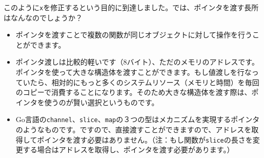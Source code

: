 このように\texttt{x}を修正するという目的に到達しました。では、ポインタを渡す長所はなんなのでしょうか？

\begin{itemize}
  \item ポインタを渡すことで複数の関数が同じオブジェクトに対して操作を行うことができます。
  \item ポインタ渡しは比較的軽いです（8バイト）、ただのメモリのアドレスです。ポインタを使って大きな構造体を渡すことができます。もし値渡しを行なっていたら、相対的にもっと多くのシステムリソース（メモリと時間）を毎回のコピーで消費することになります。そのため大きな構造体を渡す際は、ポインタを使うのが賢い選択というものです。
  \item Go言語の\texttt{channel}、\texttt{slice}、\texttt{map}の３つの型はメカニズムを実現するポインタのようなものです。ですので、直接渡すことができますので、アドレスを取得してポインタを渡す必要はありません。（注：もし関数が\texttt{slice}の長さを変更する場合はアドレスを取得し、ポインタを渡す必要があります。）
\end{itemize}

